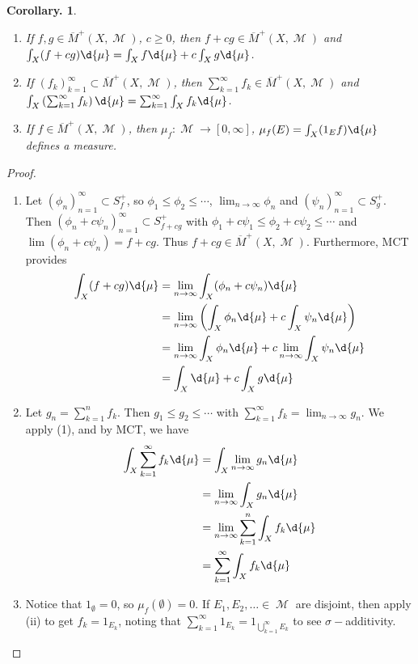 \documentclass[11pt, a4paper]{memoir}
\theoremstyle{change}
\newtheorem{corollary}[theorem]{Corollary.}
\theoremstyle{plain}
\theoremstyle{nonumberplain}
\newtheorem{proof}{Proof}
\DeclareMathOperator{\M}{{\mathcal{M}}}
\begin{document}
\begin{corollary}
    \begin{enumerate}
        \item If $f,g\in\overline{M}^+(X,\M)$, $c\geq 0$, then $f+cg\in\overline{M}^+(X,\M)$ and $\int_X(f+cg)\d{\mu}=\int_X f\d{\mu}+c\int_Xg\d{\mu}$.
        \item If $(f_k)_{k=1}^\infty\subset\overline{M}^+(X,\M)$, then $\sum_{k=1}^\infty f_k\in\overline{M}^+(X,\M)$ and $\int_X\left(\sum_{k=1}^\infty f_k\right)\d{\mu}=\sum_{k=1}^\infty\int_X f_k\d{\mu}$.
        \item If $f\in\overline{M}^+(X,\M)$, then $\mu_f:\M\to[0,\infty]$, $\mu_f(E)=\int_X(1_Ef)\d{\mu}$ defines a measure.
    \end{enumerate}
\end{corollary}
\begin{proof}
    \begin{enumerate}
        \item Let $(\phi_n)_{n=1}^\infty\subset S_f^+$, so $\phi_1\leq\phi_2\leq\cdots$, $\lim_{n\to\infty}\phi_n$ and $(\psi_n)_{n=1}^\infty\subset S_g^+$.
            Then $(\phi_n+c\psi_n)_{n=1}^\infty\subset S^+_{f+cg}$ with $\phi_1+c\psi_1\leq\phi_2+c\psi_2\leq\cdots$ and $\lim(\phi_n+c\psi_n)=f+cg$.
            Thus $f+cg\in\overline{M}^+(X,\M)$.
            Furthermore, MCT provides
            \begin{align*}
                \int_X (f+cg)\d{\mu} &= \lim_{n\to\infty}\int_X(\phi_n+c\psi_n)\d{\mu}\\
                                     &= \lim_{n\to\infty}\left(\int_X\phi_n\d{\mu}+c\int_X\psi_n\d{\mu}\right)\\
                                     &= \lim_{n\to\infty}\int_X\phi_n\d{\mu}+c\lim_{n\to\infty}\int_X\psi_n\d{\mu}\\
                                     &= \int_X\d{\mu}+c\int_Xg\d{\mu}
            \end{align*}
        \item Let $g_n=\sum_{k=1}^n f_k$.
            Then $g_1\leq g_2\leq\cdots$ with $\sum_{k=1}^\infty f_k=\lim_{n\to\infty}g_n$.
            We apply (1), and by MCT, we have
            \begin{align*}
                \int_X\sum\limits_{k=1}^\infty f_k\d{\mu} &=\int_X\lim_{n\to\infty} g_n\d{\mu}\\
                                                          &=\lim_{n\to\infty}\int_X g_n\d{\mu}\\
                                                          &=\lim_{n\to\infty}\sum\limits_{k=1}^n\int_Xf_k\d{\mu}\\
                                                          &=\sum\limits_{k=1}^\infty\int_X f_k\d{\mu}
            \end{align*}
        \item Notice that $1_\emptyset=0$, so $\mu_f(\emptyset)=0$.
            If $E_1,E_2,\ldots\in\M$ are disjoint, then apply (ii) to get $f_k=1_{E_k}$, noting that $\sum_{k=1}^\infty 1_{E_k}=1_{\bigcup_{k=1}^\infty E_k}$ to see $\sigma-$additivity.
    \end{enumerate}
\end{proof}
\end{document}

